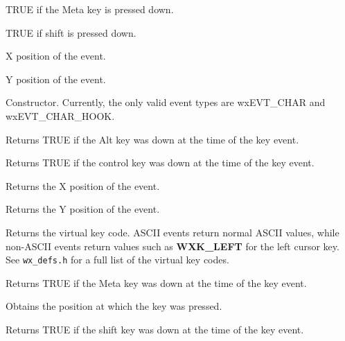 

TRUE if the Meta key is pressed down.



TRUE if shift is pressed down.



X position of the event.



Y position of the event.



Constructor. Currently, the only valid event types are wxEVT\_CHAR and wxEVT\_CHAR\_HOOK.



Returns TRUE if the Alt key was down at the time of the key event.



Returns TRUE if the control key was down at the time of the key event.



Returns the X position of the event.



Returns the Y position of the event.



Returns the virtual key code. ASCII events return normal ASCII values,
while non-ASCII events return values such as {\bf WXK\_LEFT} for the
left cursor key. See {\tt wx\_defs.h} for a full list of the virtual key codes.



Returns TRUE if the Meta key was down at the time of the key event.



Obtains the position at which the key was pressed.



Returns TRUE if the shift key was down at the time of the key event.


